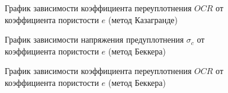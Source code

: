 \begin{figure}[h!]
  \caption{График зависимости коэффициента переуплотнения $OCR$ от 
  коэффициента пористости $e$ (метод Казагранде)}\label{fig:3por}
\end{figure}

\begin{figure}[h!]
  \caption{График зависимости напряжения предуплотнения $\sigma_c$ от 
  коэффициента пористости $e$ (метод Беккера)}\label{fig:11por}
\end{figure}

\begin{figure}[h!]
  \caption{График зависимости коэффициента переуплотнения $OCR$ от 
  коэффициента пористости $e$ (метод Беккера)}\label{fig:33por}
\end{figure}

